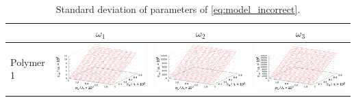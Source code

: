 \documentclass[11pt,a4paper]{article}
\theoremstyle{definition}
\begin{document}
\begin{table}[h]
  \centering
  \footnotesize
  \caption{Standard deviation of parameters of \eqref{eq:model_incorrect}.}
  \begin{tabular}{l | c c c}
	  & $\omega_1$ & $\omega_2$ & $\omega_3$ \\ \hline
	\begin{rotate}{90}Polymer 1\end{rotate} &	\includegraphics[scale=0.4]{figs/all/p1.txt_coeff0.dat.eps} & \includegraphics[scale=0.4]{figs/all/p1.txt_coeff1.dat.eps} & \includegraphics[scale=0.4]{figs/all/p1.txt_coeff2.dat.eps} \\

\end{tabular}
\end{table}
\end{document}
